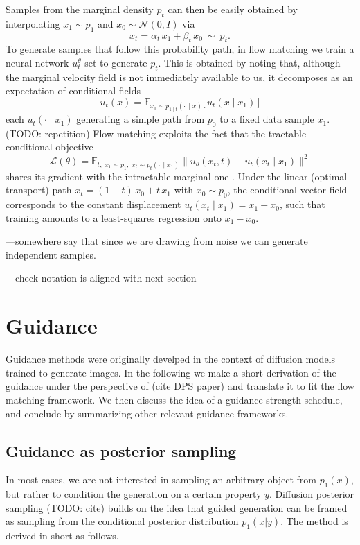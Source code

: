 Samples from the marginal density $p_t$ can then be easily obtained by interpolating $x_1 \sim p_1$ and $x_0 \sim \mathcal{N}(0,I)$ via
$$
    x_t = \alpha_t\, x_1 + \beta_t\, x_0 \ \sim\ p_t .
$$
To generate samples that follow this probability path, in flow matching we train a neural network $u_t^\theta$ set to generate $p_t$. 
This is obtained by noting that, although the marginal velocity field is
not immediately available to us, it decomposes as an expectation of conditional fields
$$u_t(x) = \mathbb{E}_{x_1 \sim p_{1\mid t}(\cdot\,\mid x)}\!\big[\,u_t(x \mid x_1)\,\big]$$
each $u_t(\cdot \mid x_1)$ generating a simple path from $p_0$ to a fixed data sample $x_1$. (TODO: repetition) Flow matching
exploits the fact that the tractable conditional objective
\begin{equation}\label{eq:fm-objective}
    \mathcal{L}(\theta) = \mathbb{E}_{t,\; x_1 \sim p_1,\; x_t \sim p_t(\cdot\,\mid x_1)}
    \big\lVert u_\theta(x_t, t) - u_t(x_t \mid x_1) \big\rVert^2
\end{equation}
shares its gradient with the intractable marginal one \parencite{lipman2023flow}. Under the linear
(optimal-transport) path $x_t = (1-t)\,x_0 + t\,x_1$ with $x_0 \sim p_0$, the conditional vector field corresponds to the
constant displacement $u_t(x_t \mid x_1) = x_1 - x_0$, such that training amounts to a least-squares
regression onto $x_1 - x_0$.

---somewhere say that since we are drawing from noise we can generate independent samples.

---check notation is aligned with next section

\section{Guidance}
Guidance methods were originally develped in the context of diffusion models trained to generate images.
In the following we make a short derivation of the guidance under the perspective of (cite DPS paper) and translate it to fit the flow matching framework.
We then discuss the idea of a guidance strength-schedule, and conclude by summarizing other relevant guidance frameworks. 

\subsection{Guidance as posterior sampling}
In most cases, we are not interested in sampling an arbitrary object from $p_1(x)$, but rather to condition the generation on a certain property $y$.
Diffusion posterior sampling \cite{...} (TODO: cite) builds on the idea that guided generation can be framed as sampling from the conditional posterior distribution $p_1(x|y)$. 
The method is derived in short as follows.

